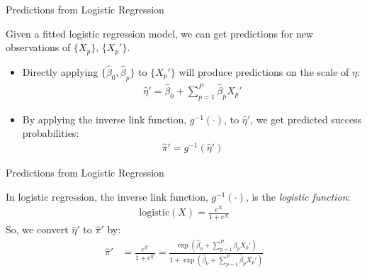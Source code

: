 \documentclass{beamer}\usepackage[]{graphicx}\usepackage[]{color}
\begin{document}

\begin{frame}{Predictions from Logistic Regression}
  
  Given a fitted logistic regression model, we can get predictions for new 
  observations of $\{X_p\}$, $\{X_p'\}$.
  \vc
  \begin{itemize}
  \item Directly applying $\{\hat{\beta}_0, \hat{\beta}_p\}$ to $\{X_p'\}$ will 
    produce predictions on the scale of $\eta$:
    \begin{align*}
      \hat{\eta}' = \hat{\beta}_0 + \sum_{p = 1}^P \hat{\beta}_p X_p'
    \end{align*}
  \item By applying the inverse link function, $g^{-1}(\cdot)$, to
    $\hat{\eta}'$, we get predicted success probabilities:
    \begin{align*}
      \hat{\pi}' = g^{-1}(\hat{\eta}')
    \end{align*}
  \end{itemize}
  
\end{frame}


\begin{frame}{Predictions from Logistic Regression}
  
  In logistic regression, the inverse link function, $g^{-1}(\cdot)$, is the
  \emph{logistic function}:
  \begin{align*}
    \text{logistic}(X) = \frac{e^X}{1 + e^X}
  \end{align*}
  So, we convert $\hat{\eta}'$ to $\hat{\pi}'$ by:
  \begin{align*}
    \hat{\pi}' &= \frac{e^{\hat{\eta}'}}{1 + e^{\hat{\eta}'}} = \frac{\exp \left( 
      \hat{\beta}_0 + \sum_{p = 1}^P \hat{\beta}_p X_p' \right) }{1 + \exp \left( 
      \hat{\beta}_0 + \sum_{p = 1}^P \hat{\beta}_p X_p' \right) }
  \end{align*}
  
\end{frame}

\end{document}

